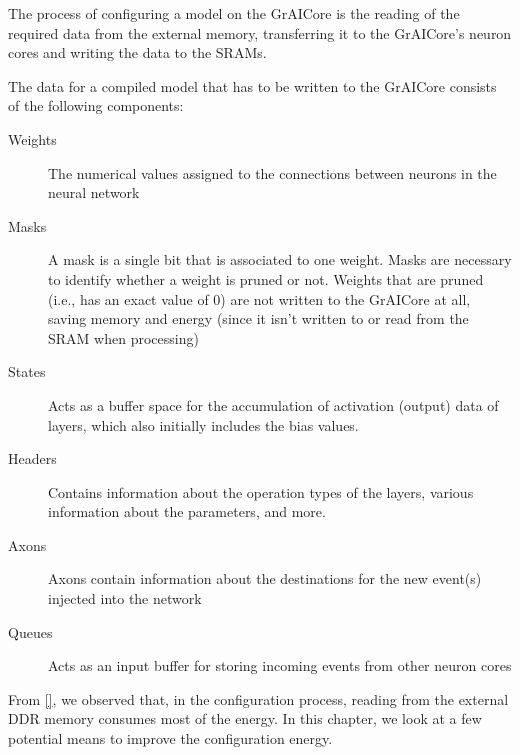 The process of configuring a model on the GrAICore is the reading of the required data from the external memory, transferring it to the GrAICore's neuron cores and writing the data to the SRAMs.

The data for a compiled model that has to be written to the GrAICore consists of the following components:
\begin{description}
    \item[Weights] 
    The numerical values assigned to the connections between neurons in the neural network
    \item[Masks] 
    A mask is a single bit that is associated to one weight.
    Masks are necessary to identify whether a weight is pruned or not.
    Weights that are pruned (i.e., has an exact value of $0$) are not written to the GrAICore at all, saving memory and energy (since it isn't written to or read from the SRAM when processing)
    \item[States] 
    Acts as a buffer space for the accumulation of activation (output) data of layers, which also initially includes the bias values.
    \item[Headers] 
    Contains information about the operation types of the layers, various information about the parameters, and more.
    \item[Axons] 
    Axons contain information about the destinations for the new event(s) injected into the network
    \item[Queues] 
    Acts as an input buffer for storing incoming events from other neuron cores 
\end{description}

From \ref{}, we observed that, in the configuration process, reading from the external DDR memory consumes most of the energy.
In this chapter, we look at a few potential means to improve the configuration energy.

